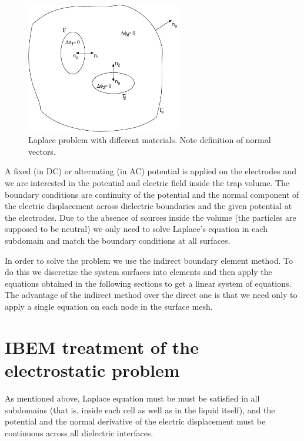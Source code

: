 \documentclass[12pt]{report}
\begin{document}
\begin{figure}[hbt]
\begin{center}
\includegraphics[width=0.6\textwidth]{ibem_laplace.pdf}
\end{center}
\caption{Laplace problem with different materials. Note definition of normal vectors.}\label{fig:laplace_domain}
\end{figure}

A fixed (in DC) or alternating (in AC) potential is applied on the electrodes and we are interested in the potential and electric field inside the trap volume. The boundary conditions are continuity of the potential and the normal component of the electric displacement across dielectric boundaries and the given potential at the electrodes. Due to the absence of sources inside the volume (the particles are supposed to be neutral) we only need to solve Laplace's equation in each subdomain and match the boundary conditions at all surfaces.

In order to solve the problem we use the indirect boundary element method. To do this we discretize the system surfaces into elements and then apply the equations obtained in the following sections to get a linear system of equations. The advantage of the indirect method over the direct one is that we need only to apply a single equation on each node in the surface mesh.

\section{IBEM treatment of the electrostatic problem}\label{sec_ibem_electrostatic}
As mentioned above, Laplace equation must be must be satisfied in all subdomains (that is, inside each cell as well as in the liquid itself), and the potential and the normal derivative of the electric displacement must be continuous across all dielectric interfaces.
\end{document}
